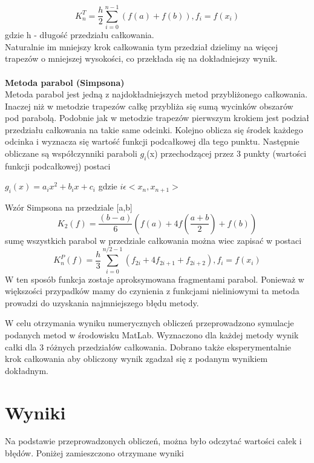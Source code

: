 \documentclass{article}
\begin{document}
	\begin{equation}	
			K_{n}^{T}=\frac{h}{2}\sum_{i=0}^{n-1} \left(f(a)+f(b)\right)  , f_{i} = f\left(x_{i}\right)
			\end{equation}
			gdzie h - długość przedziału całkowania.\\
	
	 Naturalnie im mniejszy krok całkowania tym przedział dzielimy na więcej trapezów o mniejszej wysokości, co przekłada się na dokładniejszy wynik. 
	\\\\
	\textbf {Metoda parabol (Simpsona)}
	\\ 
	Metoda parabol jest jedną z najdokładniejszych metod przybliżonego całkowania. Inaczej niż w metodzie trapezów całkę przybliża się sumą wycinków obszarów pod parabolą. Podobnie jak w metodzie trapezów pierwszym krokiem jest podział przedziału całkowania na takie same odcinki. Kolejno oblicza się środek każdego odcinka i wyznacza się wartość funkcji podcałkowej dla tego punktu. Następnie obliczane są współczynniki paraboli $g_{i}$(x) przechodzącej przez 3 punkty (wartości funkcji podcałkowej) postaci
\begin{center}$g_{i}(x)=a_{i}x^{2}+b_{i}x+c_{i} $ gdzie $i\epsilon<x_{n},x_{n+1}>$ \end{center}
\newpage
	Wzór Simpsona na przedziale [a,b]
	\begin{equation}
	K_{2}(f)=\frac{(b-a)}{6}(f(a)+4f(\frac{a+b}{2})+f(b)) 
	\end{equation}
	sumę wszystkich parabol w przedziale całkowania można wiec zapisać w postaci
		\begin{equation}
	K_{n}^{P}(f)=\frac{h}{3}\sum_{i=0}^{n/2-1}(f_{2i}+4f_{2i+1}+f_{2i+2}), f_{i} = f\left(x_{i}\right) 
	\end{equation}
	 W ten sposób funkcja zostaje aproksymowana fragmentami parabol. Ponieważ w większości przypadków mamy do czynienia z funkcjami nieliniowymi ta metoda prowadzi do uzyskania najmniejszego błędu metody.  
	 
	 
	W celu otrzymania wyniku numerycznych obliczeń przeprowadzono symulacje podanych metod w środowisku MatLab. Wyznaczono dla każdej metody wynik całki dla 3 różnych przedziałów całkowania. Dobrano także eksperymentalnie krok całkowania aby obliczony wynik zgadzał się z podanym wynikiem dokładnym.
	

	
	\section{Wyniki}
	Na podstawie przeprowadzonych obliczeń, można było odczytać wartości całek i błędów. Poniżej zamieszczono otrzymane wyniki
	
\end{document}
